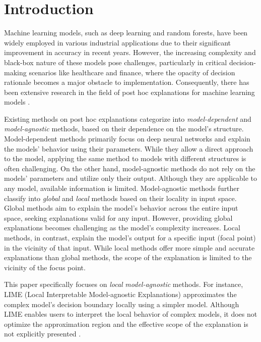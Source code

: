 \documentclass[runningheads]{llncs}
\begin{document}
\section{Introduction}
Machine learning models, such as deep learning and random forests,
have been widely employed in various industrial applications
due to their significant improvement in accuracy in recent years.
However,
the increasing complexity and black-box nature of these models pose challenges,
particularly in critical decision-making scenarios like healthcare and finance,
where the opacity of decision rationale becomes a major obstacle to
implementation.
Consequently,
there has been extensive research in the field of post hoc explanations
for machine learning models \cite{%
  ribeiro2016why,ribeiro2018anchors,radulovic2023bella,guidotti2018local}.

Existing methods on post hoc explanations categorize into
\emph{model-dependent} and \emph{model-agnostic} methods,
based on their dependence on the model's structure.
Model-dependent methods primarily focus on deep neural networks and
explain the models' behavior using their parameters.
While they allow a direct approach to the model,
applying the same method to models with different structures is often challenging.
On the other hand,
model-agnostic methods do not rely on the models' parameters and utilize only their output.
Although they are applicable to any model, available information is limited.
Model-agnostic methods further classify into
\emph{global} and \emph{local} methods based on their locality in input space.
Global methods aim to explain the model's behavior across the entire input space,
seeking explanations valid for any input.
However, providing global explanations becomes challenging as the model's complexity increases.
Local methods, in contrast, explain the model's output for a specific input
(focal point) in the vicinity of that input.
While local methods offer more simple and accurate explanations than global methods,
the scope of the explanation is limited to the vicinity of the focus point.

This paper specifically focuses on \emph{local} \emph{model-agnostic} methods.
For instance, LIME (Local Interpretable Model-agnostic Explanations)
\cite{ribeiro2016why} approximates the complex model's decision boundary
locally using a simpler model.
Although LIME enables users to interpret the local behavior of complex models,
it does not optimize the approximation region \cite{radulovic2023bella} and
the effective scope of the explanation is not explicitly presented
\cite{ribeiro2018anchors}.
\end{document}
